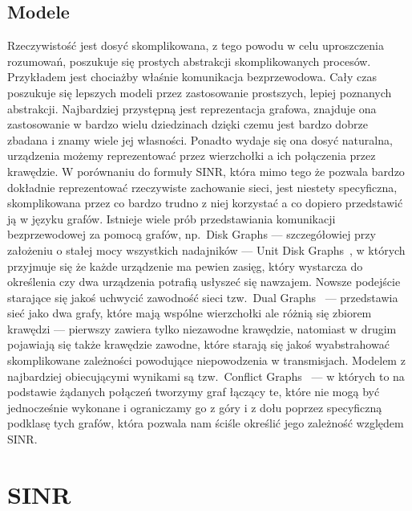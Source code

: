 \documentclass[11pt,a4paper,onecolumn,twoside]{mwart}
\begin{document}
\subsection{Modele}
Rzeczywistość jest dosyć skomplikowana, z tego powodu w celu uproszczenia
rozumowań, poszukuje się prostych abstrakcji skomplikowanych procesów.
Przykładem jest chociażby właśnie komunikacja bezprzewodowa. Cały czas poszukuje
się lepszych modeli przez zastosowanie prostszych, lepiej poznanych abstrakcji.
Najbardziej przystępną jest reprezentacja grafowa, znajduje ona zastosowanie
w bardzo wielu dziedzinach dzięki czemu jest bardzo dobrze zbadana i znamy wiele
jej własności. Ponadto wydaje się ona dosyć naturalna, urządzenia możemy
reprezentować przez wierzchołki a ich połączenia przez krawędzie. W porównaniu
do formuły SINR, która mimo tego że pozwala bardzo dokładnie reprezentować
rzeczywiste zachowanie sieci, jest niestety specyficzna, skomplikowana przez
co bardzo trudno z niej korzystać a co dopiero przedstawić ją w języku grafów.
Istnieje wiele prób przedstawiania komunikacji bezprzewodowej za pomocą grafów,
np.\ Disk Graphs --- szczegółowiej przy
założeniu o stałej mocy wszystkich nadajników --- Unit Disk
Graphs~\cite{Kuhn:2003:ANB:941079.941089}, w których przyjmuje się że każde
urządzenie ma pewien zasięg, który wystarcza do określenia czy dwa urządzenia
potrafią usłyszeć się nawzajem. Nowsze podejście starające się jakoś uchwycić
zawodność sieci tzw.\ Dual Graphs~\cite{Kuhn:2010:BUR:1835698.1835779} ---
przedstawia sieć jako dwa grafy, które mają wspólne wierzchołki ale różnią się
zbiorem krawędzi --- pierwszy zawiera tylko niezawodne krawędzie, natomiast
w drugim pojawiają się także krawędzie zawodne, które starają się jakoś
wyabstrahować skomplikowane zależności powodujące niepowodzenia w transmisjach.
Modelem z najbardziej obiecującymi wynikami są tzw.\ Conflict
Graphs~\cite{Halldorsson:2015:WGR:2746539.2746585} --- w których to na podstawie
żądanych połączeń tworzymy graf łączący te, które nie mogą być jednocześnie
wykonane i ograniczamy go z góry i z dołu poprzez specyficzną podklasę tych
grafów, która pozwala nam ściśle określić jego zależność względem SINR\@.

\section{SINR}\label{section:SINR}
\end{document}
